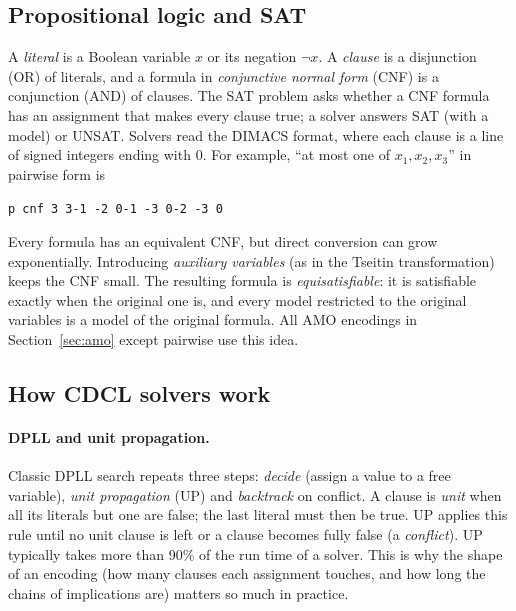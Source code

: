 \subsection{Propositional logic and SAT}
A \emph{literal} is a Boolean variable $x$ or its negation $\neg x$. A \emph{clause} is a disjunction (OR) of literals, and a formula in \emph{conjunctive normal form} (CNF) is a conjunction (AND) of clauses. The SAT problem asks whether a CNF formula has an assignment that makes every clause true; a solver answers SAT (with a model) or UNSAT. Solvers read the DIMACS format, where each clause is a line of signed integers ending with 0. For example, ``at most one of $x_1,x_2,x_3$'' in pairwise form is
\begin{center}
\texttt{p cnf 3 3}\qquad \texttt{-1 -2 0}\qquad \texttt{-1 -3 0}\qquad \texttt{-2 -3 0}
\end{center}
Every formula has an equivalent CNF, but direct conversion can grow exponentially. Introducing \emph{auxiliary variables} (as in the Tseitin transformation) keeps the CNF small. The resulting formula is \emph{equisatisfiable}: it is satisfiable exactly when the original one is, and every model restricted to the original variables is a model of the original formula. All AMO encodings in Section~\ref{sec:amo} except pairwise use this idea.

\subsection{How CDCL solvers work}\label{sec:cdcl}

\paragraph{DPLL and unit propagation.}
Classic DPLL search repeats three steps: \emph{decide} (assign a value to a free variable), \emph{unit propagation} (UP) and \emph{backtrack} on conflict. A clause is \emph{unit} when all its literals but one are false; the last literal must then be true. UP applies this rule until no unit clause is left or a clause becomes fully false (a \emph{conflict}). UP typically takes more than 90\% of the run time of a solver. This is why the shape of an encoding (how many clauses each assignment touches, and how long the chains of implications are) matters so much in practice.

